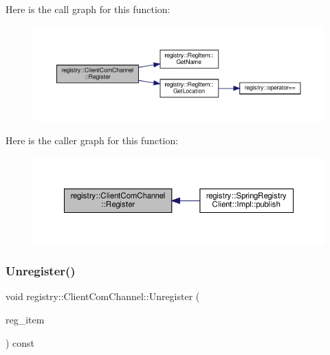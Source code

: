 Here is the call graph for this function\+:
\nopagebreak
\begin{figure}[H]
\begin{center}
\leavevmode
\includegraphics[width=350pt]{classregistry_1_1ClientComChannel_ad5566f6f10790d9090975c5be8916d40_cgraph}
\end{center}
\end{figure}
Here is the caller graph for this function\+:\nopagebreak
\begin{figure}[H]
\begin{center}
\leavevmode
\includegraphics[width=350pt]{classregistry_1_1ClientComChannel_ad5566f6f10790d9090975c5be8916d40_icgraph}
\end{center}
\end{figure}
\mbox{\label{classregistry_1_1ClientComChannel_a74566850580e7071fb6ec0f1f0498d05}} 
\subsubsection{\texorpdfstring{Unregister()}{Unregister()}}
{\footnotesize\ttfamily void registry\+::\+Client\+Com\+Channel\+::\+Unregister (\begin{DoxyParamCaption}\item[{\hyperlink{classregistry_1_1RegItem}{Reg\+Item} const \&}]{reg\+\_\+item }\end{DoxyParamCaption}) const\hspace{0.3cm}{\ttfamily [inline]}}


